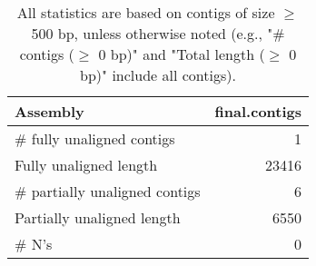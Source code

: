 \documentclass[12pt,a4paper]{article}
\begin{document}
\begin{table}[ht]
\begin{center}
\caption{All statistics are based on contigs of size $\geq$ 500 bp, unless otherwise noted (e.g., "\# contigs ($\geq$ 0 bp)" and "Total length ($\geq$ 0 bp)" include all contigs).}
\begin{tabular}{|l*{1}{|r}|}
\hline
Assembly & final.contigs \\ \hline
\# fully unaligned contigs & 1 \\ \hline
Fully unaligned length & 23416 \\ \hline
\# partially unaligned contigs & 6 \\ \hline
Partially unaligned length & 6550 \\ \hline
\# N's & 0 \\ \hline
\end{tabular}
\end{center}
\end{table}
\end{document}

